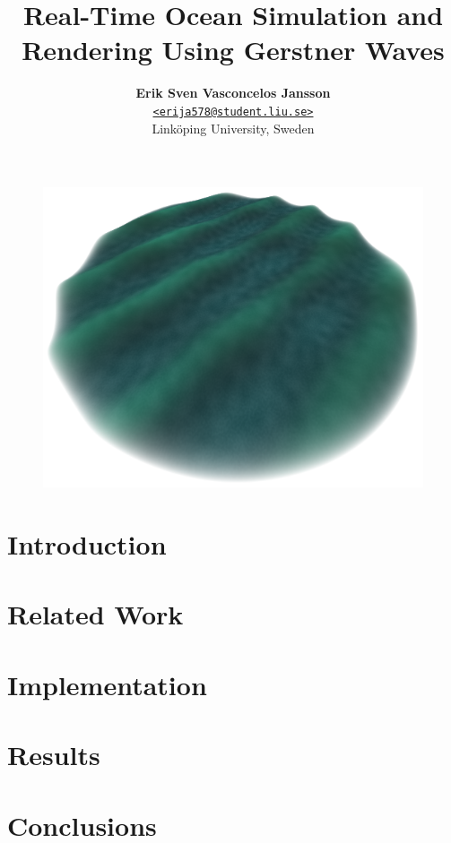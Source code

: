\documentclass[a4paper, twocolumn]{article}
\title{\vspace{-1.5em}\textbf{Real-Time Ocean Simulation and \\
                              Rendering Using Gerstner Waves}}
\author{{\textbf{Erik Sven Vasconcelos Jansson}} \\
        {\href{mailto:erija578@student.liu.se}
        {\texttt{<erija578@student.liu.se>}}} \\
        {Linköping University, Sweden}}
\begin{document}
    \maketitle

    \begin{abstract}  \end{abstract}
    \begin{figure}[h]
        \includegraphics[width=\linewidth]{figures/gerstner.png}
    \end{figure} \newpage
    \section{Introduction} \label{sec:introduction} 
    \section{Related Work} \label{sec:related_work} 
    \section{Implementation} \label{sec:implementation} 
    \section{Results} \label{sec:results} 
    \section{Conclusions} \label{sec:conclusions} 
\end{document}
